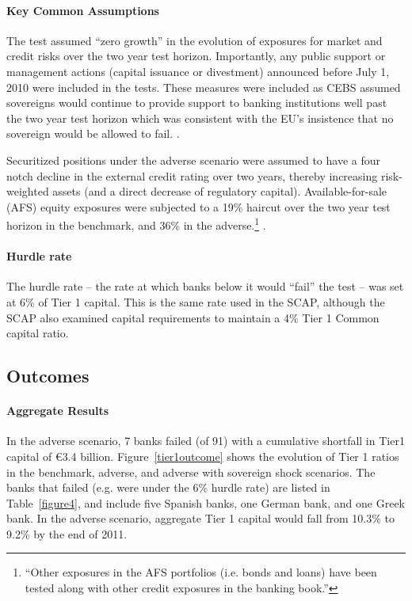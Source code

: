 \documentclass[12pt]{article}
\begin{document}
\paragraph{Key Common Assumptions}

The test assumed ``zero growth'' in the evolution of exposures for market and credit risks over the two year test horizon. Importantly, any public support or management actions (capital issuance or divestment) announced before July 1, 2010 were included in the tests. These measures were included as CEBS assumed sovereigns would continue to provide support to banking institutions well past the two year test horizon which was consistent with the EU's insistence that no sovereign would be allowed to fail. \citep{Alloway}.

Securitized positions under the adverse scenario were assumed to have a four notch decline in the external credit rating over two years, thereby increasing risk-weighted assets (and a direct decrease of regulatory capital). Available-for-sale (AFS) equity exposures were subjected to a 19\% haircut over the two year test horizon in the benchmark, and 36\% in the adverse.\footnote{``Other exposures in the AFS portfolios (i.e. bonds and loans) have been tested along with other credit exposures in the banking book.''} \citep{Methodology}.

\paragraph{Hurdle rate}

The hurdle rate -- the rate at which banks below it would ``fail'' the test -- was set at 6\% of Tier 1 capital. This is the same rate used in the SCAP, although the SCAP also examined capital requirements to maintain a 4\% Tier 1 Common capital ratio.

\subsection{Outcomes}

\paragraph{Aggregate Results} In the adverse scenario, 7 banks failed (of 91) with a cumulative shortfall in Tier1 capital of \euro{3.4} billion. Figure~\ref{tier1outcome} shows the evolution of Tier 1 ratios in the benchmark, adverse, and adverse with sovereign shock scenarios. The banks that failed (e.g. were under the 6\% hurdle rate) are listed in Table~\ref{figure4}, and include five Spanish banks, one German bank, and one Greek bank. In the adverse scenario, aggregate Tier 1 capital would fall from 10.3\% to 9.2\% by the end of 2011.
\end{document}
